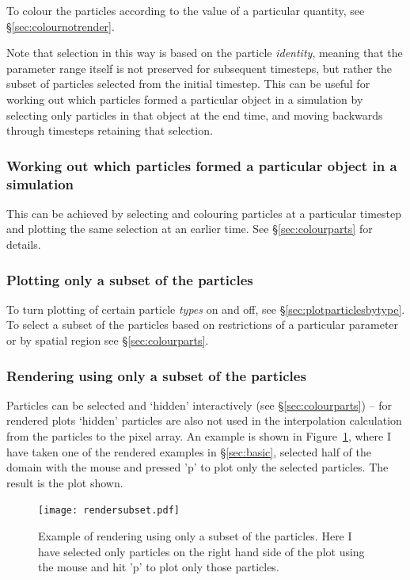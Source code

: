 \documentclass[a4paper,11pt]{article}
\begin{document}
 To colour the particles according to the value of a particular quantity, see \S\ref{sec:colournotrender}.

 Note that selection in this way is based on the particle \emph{identity}, meaning that the parameter range itself is not preserved for subsequent timesteps, but rather the subset of particles selected from the initial timestep. This can be useful for working out which particles formed a particular object in a simulation by selecting only particles in that object at the end time, and moving backwards through timesteps retaining that selection.

\subsubsection{ Working out which particles formed a particular object in a simulation}
This can be achieved by selecting and colouring particles at a particular timestep and plotting the same selection at an earlier time. See \S\ref{sec:colourparts} for details.

\subsubsection{ Plotting only a subset of the particles}
 To turn plotting of certain particle \emph{types} on and off, see \S\ref{sec:plotparticlesbytype}. To select a subset of the particles based on restrictions of a particular parameter or by spatial region see \S\ref{sec:colourparts}.

\subsubsection{ Rendering using only a subset of the particles}
\label{sec:rendersubset}
 Particles can be selected and `hidden' interactively (see \S\ref{sec:colourparts}) -- for rendered plots `hidden' particles are also not used in the interpolation calculation from the particles to the pixel array. An example is shown in Figure~\ref{fig:rendersubset}, where I have taken one of the rendered examples in \S\ref{sec:basic}, selected half of the domain with the mouse and pressed 'p' to plot only the selected particles. The result is the plot shown.
\begin{figure}[h]
\begin{center}
\texttt{[image: rendersubset.pdf]}
\caption{Example of rendering using only a subset of the particles. Here I have selected only particles on the right hand side of the plot using the mouse and hit 'p' to plot only those particles.}
\label{fig:rendersubset}
\end{center}
\end{figure}
\end{document}
